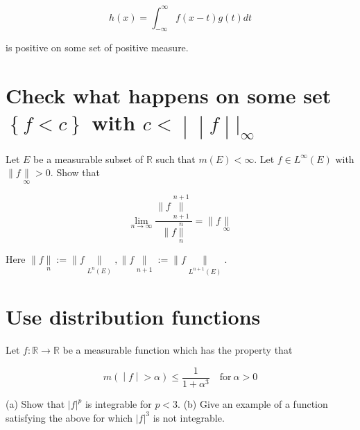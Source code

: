 \[h(x) = \int_{- \infty}^{\infty}f(x - t)g(t)dt\]

is positive on some set of positive measure.

\chapter{\texorpdfstring{Check what happens on some set \(\left\{ {f < c} \right\}\) with \(\left. c < \middle| \middle| f \middle| |_{\infty} \right.\)}{Check what happens on some set \textbackslash left\textbackslash\{ \{f \textless{} c\} \textbackslash right\textbackslash\} with \textbackslash left. c \textless{} \textbackslash middle\textbar{} \textbackslash middle\textbar{} f \textbackslash middle\textbar{} \textbar\_\{\textbackslash infty\} \textbackslash right.}}\label{check-what-happens-on-some-set-fc-with-cf_infty}

Let \(E\) be a measurable subset of \(\mathbb{R}\) such that \(m(E) < \infty\). Let \(f \in L^{\infty}(E)\) with \(\parallel f\underset{\infty}{\parallel} > 0\). Show that

\[\lim\limits_{n\rightarrow\infty}\frac{\parallel f\underset{n + 1}{\overset{n + 1}{\parallel}}}{\parallel f\underset{n}{\overset{n}{\parallel}}} = \parallel f\underset{\infty}{\parallel}\]

Here \(\parallel f\underset{n}{\parallel} := \parallel f\underset{L^{n}(E)}{\parallel}, \parallel f\underset{n + 1}{\parallel} := \parallel f\underset{L^{n + 1}(E)}{\parallel}\).

\chapter{Use distribution functions}\label{use-distribution-functions}

Let \(f:\mathbb{R}\rightarrow\mathbb{R}\) be a measurable function which has the property that

\[\left. m( \middle| f \middle| > \alpha) \leq \frac{1}{1 + \alpha^{3}}\quad\text{for}\ \alpha > 0 \right.\]

(a) Show that \(|f|^{p}\) is integrable for \(p < 3\). (b) Give an example of a function satisfying the above for which \(|f|^{3}\) is not integrable.
